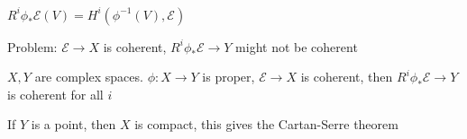 \documentclass[../main.tex]{subfiles}
\begin{document}
$R^i\phi_*\mathcal E(V)=H^i(\phi^{-1}(V),\mathcal E)$

Problem:  $\mathcal E\to X$ is coherent, $R^i\phi_*\mathcal E\to Y$ might not be coherent

\begin{theorem}
$X,Y$ are complex spaces. $\phi:X\to Y$ is proper, $\mathcal E\to X$ is coherent, then $R^i\phi_*\mathcal E\to Y$ is coherent for all $i$
\end{theorem}

\begin{note}
If $Y$ is a point, then $X$ is compact, this gives the Cartan-Serre theorem
\end{note}
\end{document}

